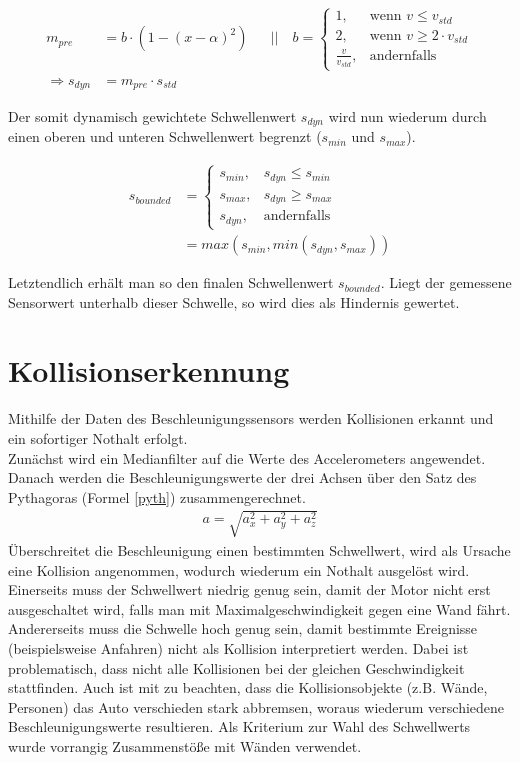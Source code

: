 \documentclass[a4paper,12pt]{report}
\begin{document}
	\begin{align*}
		m_{pre} &= b \cdot \left(1 - \left(x-\alpha\right)^2\right)
		&&||\quad b=
		\begin{cases}
		1,					& \text{wenn } v \leq v_{std} \\
		2,					& \text{wenn } v \geq 2 \cdot v_{std} \\
		\frac{v}{v_{std}}, 	& \text{andernfalls}
		\end{cases}
		\\
		\Rightarrow s_{dyn} &= m_{pre} \cdot s_{std}
	\end{align*}

	Der somit dynamisch gewichtete Schwellenwert $s_{dyn}$ wird nun wiederum durch einen oberen und unteren Schwellenwert begrenzt ($s_{min}$ und $s_{max}$).

	\begin{align*}
		s_{bounded} &=
		\begin{cases}
		s_{min},										& s_{dyn} \leq s_{min} \\
		s_{max},										& s_{dyn} \geq s_{max} \\
		s_{dyn}, 										& \text{andernfalls}
		\end{cases}
		\\
		&= max(s_{min}, min(s_{dyn}, s_{max}))
	\end{align*}

	Letztendlich erhält man so den finalen Schwellenwert $s_{bounded}$.
	Liegt der gemessene Sensorwert unterhalb dieser Schwelle, so wird dies als Hindernis gewertet.

\chapter{Kollisionserkennung}


	Mithilfe der Daten des Beschleunigungssensors werden Kollisionen erkannt und ein sofortiger Nothalt erfolgt.\\
Zunächst wird ein Medianfilter auf die Werte des Accelerometers angewendet. Danach werden die Beschleunigungswerte der drei Achsen über den Satz des Pythagoras (Formel \ref{pyth}) zusammengerechnet.
\begin{align}
	a = \sqrt{a_{x}^2+a_{y}^2+a_{z}^2}
	\label{pyth}
\end{align}
Überschreitet die Beschleunigung einen bestimmten Schwellwert, wird als Ursache eine Kollision angenommen, wodurch wiederum ein Nothalt ausgelöst wird.\\
Einerseits muss der Schwellwert niedrig genug sein, damit der Motor nicht erst ausgeschaltet wird, falls man mit Maximalgeschwindigkeit gegen eine Wand fährt. Andererseits muss die Schwelle hoch genug sein, damit bestimmte Ereignisse (beispielsweise Anfahren) nicht als Kollision interpretiert werden. Dabei ist problematisch, dass nicht alle Kollisionen bei der gleichen Geschwindigkeit stattfinden. Auch ist mit zu beachten, dass die Kollisionsobjekte (z.B. Wände, Personen) das Auto verschieden stark abbremsen, woraus wiederum verschiedene Beschleunigungswerte resultieren. Als Kriterium zur Wahl des Schwellwerts wurde vorrangig Zusammenstöße mit Wänden verwendet.
\end{document}
